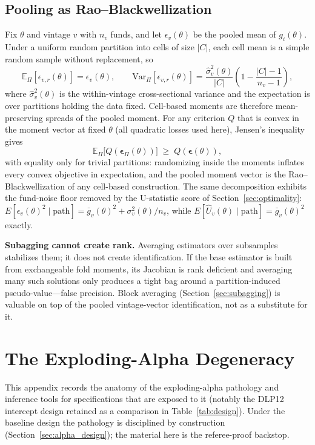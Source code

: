 \documentclass[11pt]{article}
\begin{document}
\subsection{Pooling as Rao--Blackwellization}
\label{app:rao_blackwell}

Fix \(\theta\) and vintage \(v\) with \(n_v\) funds, and let \(\epsilon_v(\theta)\) be the pooled mean of \(g_i(\theta)\). Under a uniform random partition into cells of size \(|C|\), each cell mean is a simple random sample without replacement, so
\[
\mathbb E_{\Pi}\!\left[\epsilon_{v,r}(\theta)\right]=\epsilon_v(\theta),
\qquad
\mathrm{Var}_{\Pi}\!\left[\epsilon_{v,r}(\theta)\right]
=\frac{\widehat\sigma_v^2(\theta)}{|C|}\left(1-\frac{|C|-1}{n_v-1}\right),
\]
where \(\widehat\sigma_v^2(\theta)\) is the within-vintage cross-sectional variance and the expectation is over partitions holding the data fixed. Cell-based moments are therefore mean-preserving spreads of the pooled moment. For any criterion \(Q\) that is convex in the moment vector at fixed \(\theta\) (all quadratic losses used here), Jensen's inequality gives
\[
\mathbb E_{\Pi}\bigl[Q(\boldsymbol\epsilon_{\Pi}(\theta))\bigr]\;\ge\;Q(\boldsymbol\epsilon(\theta)),
\]
with equality only for trivial partitions: randomizing inside the moments inflates every convex objective in expectation, and the pooled moment vector is the Rao--Blackwellization of any cell-based construction. The same decomposition exhibits the fund-noise floor removed by the U-statistic score of Section~\ref{sec:optimality}: \(E[\epsilon_v(\theta)^2\mid\text{path}]=\bar g_v(\theta)^2+\sigma_v^2(\theta)/n_v\), while \(E[\widehat U_v(\theta)\mid\text{path}]=\bar g_v(\theta)^2\) exactly.

\textbf{Subagging cannot create rank.} Averaging estimators over subsamples stabilizes them; it does not create identification. If the base estimator is built from exchangeable fold moments, its Jacobian is rank deficient and averaging many such solutions only produces a tight bag around a partition-induced pseudo-value---false precision. Block averaging (Section~\ref{sec:subagging}) is valuable on top of the pooled vintage-vector identification, not as a substitute for it.

\section{The Exploding-Alpha Degeneracy}
\label{app:alpha}

This appendix records the anatomy of the exploding-alpha pathology and inference tools for specifications that are exposed to it (notably the DLP12 intercept design retained as a comparison in Table~\ref{tab:design}). Under the baseline design the pathology is disciplined by construction (Section~\ref{sec:alpha_design}); the material here is the referee-proof backstop.
\end{document}
